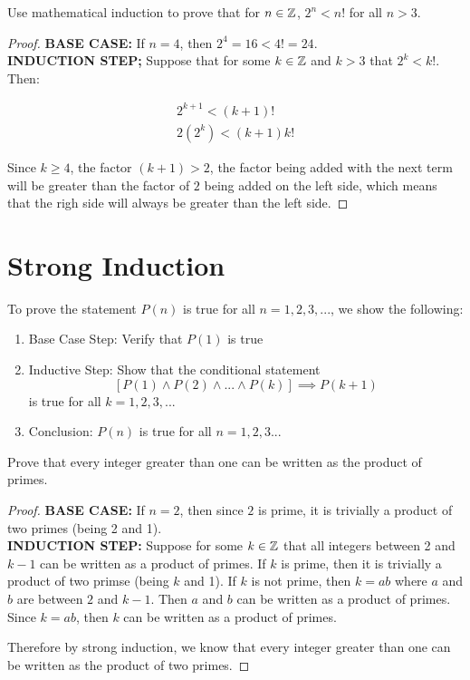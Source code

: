 \begin{problem}
    Use mathematical induction to prove that for $n\in\mathbb{Z}$, $2^n < n!$ for all $n > 3$.

    \begin{proof}
        \textbf{BASE CASE:} If $n = 4$, then $2^4=16<4!=24$.\\

        \textbf{INDUCTION STEP;} Suppose that for some $k\in\mathbb{Z}$  and $k > 3$ that $2^k < k!$. Then:

        $$
        \begin{aligned}
            2^{k+1} < (k+1)!\\
            2(2^k) < (k+1)k!
        \end{aligned}
        $$

        Since $k\ge 4$, the factor $(k+1)>2$, the factor being added with the next term will be greater than the factor of $2$ being added on the left side, which means that the righ side will always be greater than the left side.
    \end{proof}
\end{problem}


\section{Strong Induction}

To prove the statement $P(n)$ is true for all $n=1,2,3,...$, we show the following:
    
    \begin{enumerate}
        \item Base Case Step: Verify that $P(1)$ is true
        \item Inductive Step: Show that the conditional statement $$[P(1) \wedge P(2) \wedge... \wedge P(k)] \implies P(k+1)$$ is true for all $k = 1,2,3,...$
        \item Conclusion: $P(n)$ is true for all $n=1,2,3...$
    \end{enumerate}

\begin{problem}
    Prove that every integer greater than one can be written as the product of primes.

    \begin{proof}
        \textbf{BASE CASE:} If $n = 2$, then since $2$ is prime, it is trivially a product of two primes (being 2 and 1).\\

        \textbf{INDUCTION STEP:} Suppose for some $k \in \mathbb{Z}$ that all integers between 2 and $k-1$ can be written as a product of primes. If $k$ is prime, then it is trivially a product of two primse (being $k$ and 1). If $k$ is not prime, then $k = ab$ where $a$ and $b$ are between $2$ and $k-1$. Then $a$ and $b$ can be written as a product of primes. Since $k=ab$, then $k$ can be written as a product of primes. 

        Therefore by strong induction, we know that every integer greater than one can be written as the product of two primes.
    \end{proof}
\end{problem}